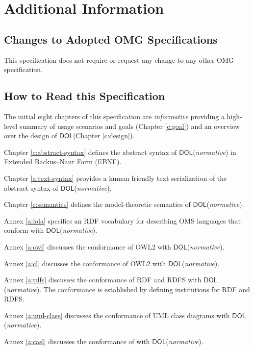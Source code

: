 \documentclass[10pt,fleqn,%
\ifpretendfinal
final%
\else
draft%
\fi,
]{scrreprt}
\newcommand*{\DOL}{\ensuremath{\mathsf{DOL}}\xspace}
\begin{document}
\chapter{Additional Information}
\section{Changes to Adopted OMG Specifications}
This specification does not require or request any change to any other OMG specification. 

\section{How to Read this Specification}
The initial eight chapters of this specification are \emph{informative} providing  a high-level
 summary of usage scenarios and goals (Chapter \ref{c:goal}) and an overview over the design of
\DOL  (Chapter \ref{c:design}).

\medskip \noindent 
Chapter \ref{c:abstract-syntax} defines the abstract syntax of \DOL (\emph{normative}) in Extended
Backus–Naur Form (EBNF).  

\medskip \noindent 
Chapter \ref{a:text-syntax} provides a human friendly text serialization of the abstract syntax of 
\DOL (\emph{normative}). 

\medskip \noindent 
Chapter \ref{c:semantics} defines the model-theoretic semantics of \DOL (\emph{normative}). 

\medskip \noindent 
Annex \ref{a:lola} specifies an RDF vocabulary for describing OMS languages that 
conform with \DOL  (\emph{normative}). 

\medskip \noindent 
Annex \ref{a:owl} discusses the conformance of OWL2 with \DOL  (\emph{normative}). 

\medskip \noindent 
Annex \ref{a:cl} discusses the conformance of OWL2 with \DOL  (\emph{normative}). 

\medskip \noindent 
Annex \ref{a:rdfs} discusses the conformance of RDF and RDFS with \DOL  (\emph{normative}). The
 conformance is established by defining institutions for RDF and RDFS. 

\medskip \noindent 
Annex \ref{a:uml-class} discusses the conformance of UML class diagrams with \DOL 
 (\emph{normative}).

\medskip \noindent 
Annex \ref{a:casl} discusses the conformance of \CASL with \DOL  (\emph{normative}).
\end{document}
